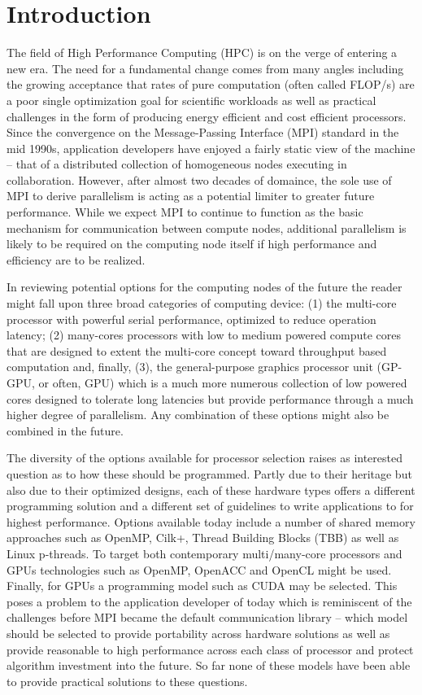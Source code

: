 

\chapter{Introduction}\label{C:intro}

\noindent
The field of High Performance Computing (HPC) is on the verge of entering a new era. The need
for a fundamental change comes from many angles including the growing acceptance that rates of
pure computation (often called FLOP/s) are a poor single optimization goal for scientific
workloads as well as practical challenges in the form of producing energy efficient and cost
efficient processors. Since the convergence on the Message-Passing Interface (MPI) standard
in the mid 1990s, application developers have enjoyed a fairly static view of the machine --
that of a distributed collection of homogeneous nodes executing in collaboration. However, 
after almost two decades of domaince, the sole use of MPI to derive parallelism is acting as
a potential limiter to greater future performance. While we expect MPI to continue to function
as the basic mechanism for communication between compute nodes, additional parallelism is
likely to be required on the computing node itself if high performance and efficiency are to be
realized.

In reviewing potential options for the computing nodes of the future the reader might fall
upon three broad categories of computing device: (1) the multi-core processor with powerful
serial performance, optimized to reduce operation latency; (2) many-cores processors with
low to medium powered compute cores that are designed to extent the multi-core concept toward
throughput based computation and, finally, (3), the general-purpose graphics processor unit
(GP-GPU, or often, GPU) which is a much more numerous collection of low powered cores designed
to tolerate long latencies but provide performance through a much higher degree of 
parallelism. Any combination of these options might also be combined in the future.

The diversity of the options available for processor selection raises as interested question
as to how these should be programmed. Partly due to their heritage but also due to their
optimized designs, each of these hardware types offers a different programming solution and
a different set of guidelines to write applications to for highest performance. Options available
today include a number of shared memory approaches such as OpenMP, Cilk+, Thread Building Blocks
(TBB) as well as Linux p-threads. To target both contemporary multi/many-core processors and
GPUs technologies such as OpenMP, OpenACC and OpenCL might be used. Finally, for GPUs a 
programming model such as CUDA may be selected. This poses a problem to the application
developer of today which is reminiscent of the challenges before MPI became the default
communication library -- which model should be selected to provide portability across hardware
solutions as well as provide reasonable to high performance across each class of processor and
protect algorithm investment into the future. So far none of these models have been able to 
provide practical solutions to these questions.

